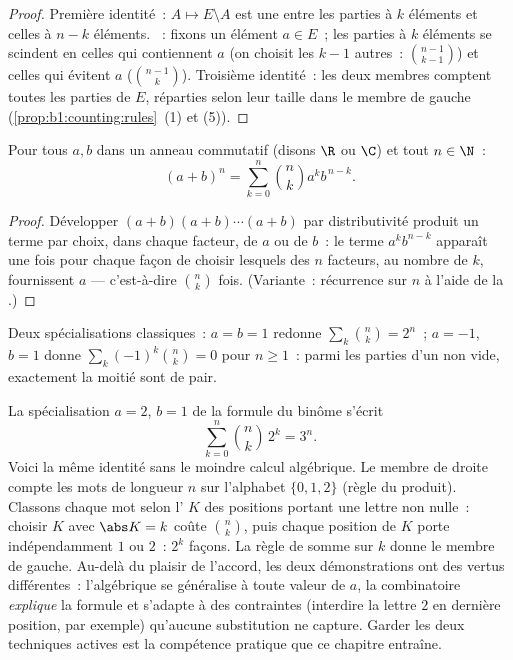 \begin{proof}
Première identité~: $A \mapsto E \setminus A$ est une  entre les
parties à $k$ éléments et celles à $n-k$ éléments. ~: fixons un élément $a \in E$~; les
parties à $k$ éléments se scindent en celles qui contiennent
$a$ (on choisit les $k - 1$ autres~: $\binom{n-1}{k-1}$) et celles qui
évitent $a$ ($\binom{n-1}{k}$). Troisième identité~: les deux membres
comptent toutes les parties de $E$, réparties selon leur taille dans le
membre de gauche (\cref{prop:b1:counting:rules}~(1) et (5)).
\end{proof}

\begin{theorem}\label{thm:b1:counting:binomial}
Pour tous $a, b$ dans un anneau commutatif (disons $\R$ ou $\C$) et tout $n \in \N$~:
\[
(a + b)^n = \sum_{k=0}^{n} \binom{n}{k} a^k b^{\,n-k} .
\]
\end{theorem}

\begin{proof}
Développer $(a+b)(a+b)\cdots(a+b)$ par distributivité produit un terme
par choix, dans chaque facteur, de $a$ ou de $b$~: le terme $a^k b^{n-k}$
apparaît une fois pour chaque façon de choisir lesquels des $n$ facteurs,
au nombre de $k$, fournissent $a$ --- c'est-à-dire $\binom nk$ fois.
(Variante~: récurrence sur $n$ à l'aide de la .)
\end{proof}

\begin{example}\label{ex:b1:counting:binomial}
Deux spécialisations classiques~: $a = b = 1$ redonne $\sum_k \binom nk
= 2^n$~; $a = -1$, $b = 1$ donne $\sum_{k} (-1)^k \binom nk = 0$ pour
$n \geq 1$~: parmi les parties d'un  non vide, exactement la
moitié sont de  pair.
\end{example}

\begin{example}\label{ex:b1:counting:threen}
La spécialisation $a = 2$, $b = 1$ de la formule du binôme s'écrit
\[
\sum_{k=0}^{n} \binom nk\,2^k = 3^n .
\]
Voici la même identité sans le moindre calcul algébrique. Le membre de
droite compte les mots de longueur $n$ sur l'alphabet $\{0, 1, 2\}$
(règle du produit). Classons chaque mot selon l' $K$ des
positions portant une lettre non nulle~: choisir $K$ avec $\abs K = k$
coûte $\binom nk$, puis chaque position de $K$ porte indépendamment $1$
ou $2$~: $2^k$ façons. La règle de somme sur $k$ donne le membre de
gauche. Au-delà du plaisir de l'accord, les deux démonstrations ont des
vertus différentes~: l'algébrique se généralise à toute valeur de $a$,
la combinatoire \emph{explique} la formule et s'adapte à des contraintes
(interdire la lettre $2$ en dernière position, par exemple) qu'aucune
substitution ne capture. Garder les deux techniques actives est la
compétence pratique que ce chapitre entraîne.
\end{example}

